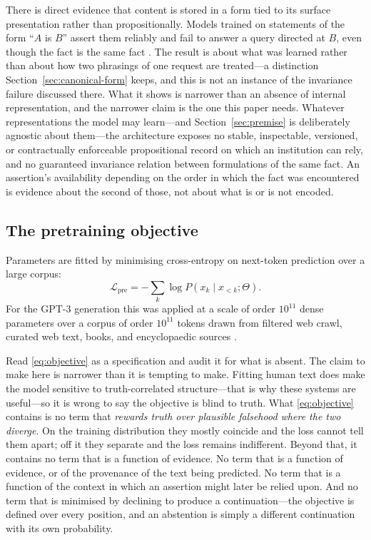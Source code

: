 There is direct evidence that content is stored in a form tied to its surface
presentation rather than propositionally. Models trained on statements of the form
``$A$ is $B$'' assert them reliably and fail to answer a query directed at $B$, even
though the fact is the same fact \citep{berglund2024}. The result is about what was
learned rather than about how two phrasings of one request are treated---a
distinction Section~\ref{sec:canonical-form} keeps, and this is not an instance of
the invariance failure discussed there. What it shows is narrower than an
absence of internal representation, and the narrower claim is the one this paper needs.
Whatever representations the model may learn---and Section~\ref{sec:premise} is
deliberately agnostic about them---the architecture exposes no stable, inspectable,
versioned, or contractually enforceable propositional record on which an institution can
rely, and no guaranteed invariance relation between formulations of the same fact. An
assertion's availability depending on the order in which the fact was encountered is
evidence about the second of those, not about what is or is not encoded.

\subsection{The pretraining objective}
\label{sec:pretraining}

Parameters are fitted by minimising cross-entropy on next-token prediction over a
large corpus:
\begin{equation}
  \mathcal{L}_{\mathrm{pre}}
  = -\sum_{k} \log P\!\left(x_k \mid x_{<k}; \Theta\right).
  \label{eq:objective}
\end{equation}
For the GPT-3 generation this was applied at a scale of order $10^{11}$ dense
parameters over a corpus of order $10^{11}$ tokens drawn from filtered web crawl,
curated web text, books, and encyclopaedic sources \citep{brown2020}.

Read \eqref{eq:objective} as a specification and audit it for what is absent. The
claim to make here is narrower than it is tempting to make. Fitting human text does
make the model sensitive to truth-correlated structure---that is why these systems are
useful---so it is wrong to say the objective is blind to truth. What
\eqref{eq:objective} contains is no term that \emph{rewards truth over plausible
falsehood where the two diverge}. On the training distribution they mostly coincide
and the loss cannot tell them apart; off it they separate and the loss remains
indifferent. Beyond that, it contains no term that is a function of evidence. No term that is a function of
evidence, or of the provenance of the text being predicted. No term that is a
function of the context in which an assertion might later be relied upon. And no
term that is minimised by declining to produce a continuation---the objective is
defined over every position, and an abstention is simply a different continuation
with its own probability.

